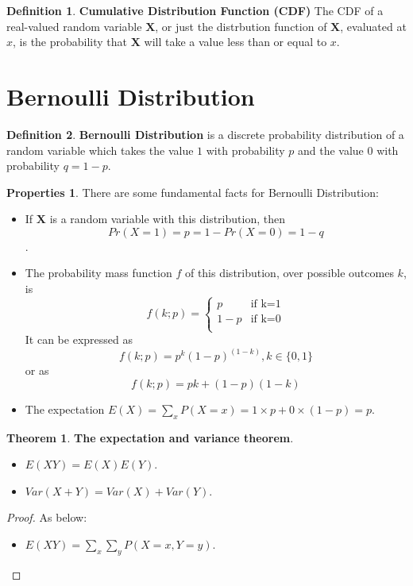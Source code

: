 \documentclass{article}
\theoremstyle{definition}
\newtheorem{defi}{Definition}[section]
\newtheorem{theorem}{Theorem}[section]
\newtheorem{prop}{Properties}[section]
\begin{document}
\begin{defi}
\textbf{Cumulative Distribution Function (CDF)} The CDF of a real-valued random variable $\textbf{X}$, or just the distrbution function of $\textbf{X}$, evaluated at $x$, is the probability that $\textbf{X}$ will take a value less than or equal to $x$.
\end{defi}

\section{Bernoulli Distribution}
\begin{defi}
\textbf{Bernoulli Distribution} is a discrete probability distribution of a random variable which takes the value $1$ with probability $p$ and the value $0$ with probability $q=1-p$.
\end{defi}
\begin{prop} There are some fundamental facts for Bernoulli Distribution:
\begin{itemize}
    \item If $\textbf{X}$ is a random variable with this distribution, then $$Pr(X=1)=p=1-Pr(X=0)=1-q$$.
    \item The probability mass function $f$ of this distribution, over possible outcomes $k$, is $$f(k;p)=\begin{cases}
               p & \text{if k=1}\\
               1-p & \text{if k=0} \\
            \end{cases}$$ It can be expressed as $$f(k;p)=p^k(1-p)^{(1-k)}, k\in\{0,1\}$$ or as $$f(k;p)=pk+(1-p)(1-k)$$
    \item The expectation $E(X)=\sum_{x}P(X=x)=1\times p + 0\times (1-p)=p$.
\end{itemize}
\end{prop}
\begin{theorem}
\textbf{The expectation and variance theorem}. 
    \begin{itemize}
        \item $E(XY)=E(X)E(Y)$.
        \item $Var(X+Y)=Var(X)+Var(Y)$.
    \end{itemize}
\begin{proof}
As below:
\begin{itemize}
    \item $E(XY)=\sum_{x}\sum_{y}P(X=x, Y=y)$.
\end{itemize}
\end{proof}
\end{theorem}
\end{document}
